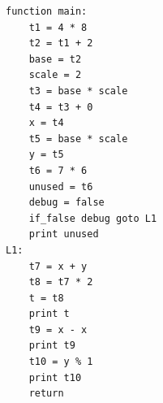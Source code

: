\begin{lstlisting}[]
function main:
    t1 = 4 * 8
    t2 = t1 + 2
    base = t2
    scale = 2
    t3 = base * scale
    t4 = t3 + 0
    x = t4
    t5 = base * scale
    y = t5
    t6 = 7 * 6
    unused = t6
    debug = false
    if_false debug goto L1
    print unused
L1:
    t7 = x + y
    t8 = t7 * 2
    t = t8
    print t
    t9 = x - x
    print t9
    t10 = y % 1
    print t10
    return
\end{lstlisting}
